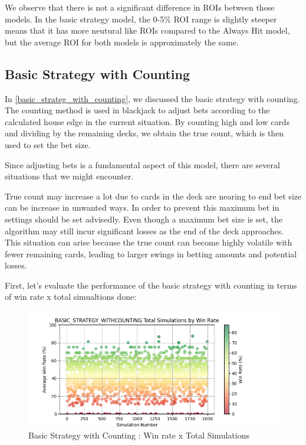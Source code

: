\documentclass[a4paper,12pt]{report}
\begin{document}
We observe that there is not a significant difference in ROIs between these models. In the basic strategy model, the 0-5\% ROI range is slightly steeper means that it has more neutural like ROIs compared to the Always Hit model, but the average ROI for both models is approximately the same.

\subsection{Basic Strategy with Counting}

In \ref{basic_strateg_with_counting}, we discussed the basic strategy with counting. The counting method is used in blackjack to adjust bets according to the calculated house edge in the current situation. By counting high and low cards and dividing by the remaining decks, we obtain the true count, which is then used to set the bet size.

Since adjusting bets is a fundamental aspect of this model, there are several situations that we might encounter. 

True count may increase a lot due to cards in the deck are nearing to end bet size can be increase in unwanted ways. In order to prevent this maximum bet in settings should be set advisedly. Even though a maximum bet size is set, the algorithm may still incur significant losses as the end of the deck approaches. This situation can arise because the true count can become highly volatile with fewer remaining cards, leading to larger swings in betting amounts and potential losses.

First, let's evaluate the performance of the basic strategy with counting in terms of win rate x total simualtions done:

\begin{figure}[h]
\begin{center}
\includegraphics[scale=0.6]{figures/graphs/bsc_wr_ts.png}
\end{center}
\caption{Basic Strategy with Counting : Win rate x Total Simulations}
\label{fig:bsc_wr_ts}
\end{figure}
\end{document}
